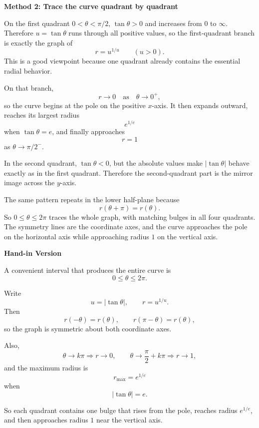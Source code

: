 \documentclass[a4paper,12pt,twocolumn]{article}
\newenvironment{solutionbox}{\begin{framed}}{\end{framed}}
\begin{document}
\begin{solutionbox}
\textbf{Method 2: Trace the curve quadrant by quadrant}

\begin{steps}
\item On the first quadrant \(0<\theta<\pi/2\), \(\tan\theta>0\) and increases from \(0\) to \(\infty\). Therefore \(u=\tan\theta\) runs through all positive values, so the first-quadrant branch is exactly the graph of
\[
r=u^{1/u}
\qquad (u>0).
\]
This is a good viewpoint because one quadrant already contains the essential radial behavior.

\item On that branch,
\[
r\to 0 \quad\text{as}\quad \theta\to 0^+,
\]
so the curve begins at the pole on the positive \(x\)-axis. It then expands outward, reaches its largest radius
\[
e^{1/e}
\]
when \(\tan\theta=e\), and finally approaches
\[
r=1
\]
as \(\theta\to \pi/2^-\).

\item In the second quadrant, \(\tan\theta<0\), but the absolute values make \(\lvert\tan\theta\rvert\) behave exactly as in the first quadrant. Therefore the second-quadrant part is the mirror image across the \(y\)-axis.

\item The same pattern repeats in the lower half-plane because
\[
r(\theta+\pi)=r(\theta).
\]
So \(0\le \theta\le 2\pi\) traces the whole graph, with matching bulges in all four quadrants. The symmetry lines are the coordinate axes, and the curve approaches the pole on the horizontal axis while approaching radius \(1\) on the vertical axis.
\end{steps}
\end{solutionbox}

\begin{solutionbox}
\textbf{Hand-in Version}

A convenient interval that produces the entire curve is
\[
\boxed{0\le \theta\le 2\pi.}
\]

Write
\[
u=\lvert\tan\theta\rvert,
\qquad
r=u^{1/u}.
\]
Then
\[
r(-\theta)=r(\theta),
\qquad
r(\pi-\theta)=r(\theta),
\]
so the graph is symmetric about both coordinate axes.

Also,
\[
\theta\to k\pi \Longrightarrow r\to 0,
\qquad
\theta\to \frac{\pi}{2}+k\pi \Longrightarrow r\to 1,
\]
and the maximum radius is
\[
\boxed{r_{\max}=e^{1/e}}
\]
when
\[
\boxed{\lvert\tan\theta\rvert=e.}
\]

So each quadrant contains one bulge that rises from the pole, reaches radius \(e^{1/e}\), and then approaches radius \(1\) near the vertical axis.
\end{solutionbox}
\end{document}
